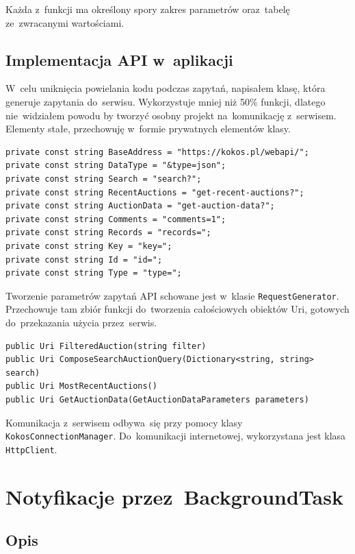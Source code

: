 \documentclass[a4paper,twoside,titlepage,openright]{book}
\begin{document}
Każda z~funkcji ma określony spory zakres parametrów oraz~tabelę ze~zwracanymi wartościami. 


\subsection{Implementacja API w~aplikacji}

W~celu uniknięcia powielania kodu podczas zapytań, napisałem klasę, która generuje zapytania do~serwisu. Wykorzystuje mniej niż 50\% funkcji, dlatego nie~widziałem powodu by tworzyć osobny projekt na~komunikację z~serwisem. Elementy stałe, przechowuję w~formie prywatnych elementów klasy.

\noindent
\begin{lstlisting}[caption=Składowe budujące zapytanie do~serwisu, label=lst:test]
private const string BaseAddress = "https://kokos.pl/webapi/";
private const string DataType = "&type=json";
private const string Search = "search?";
private const string RecentAuctions = "get-recent-auctions?";
private const string AuctionData = "get-auction-data?";
private const string Comments = "comments=1";
private const string Records = "records=";
private const string Key = "key=";
private const string Id = "id=";
private const string Type = "type=";
\end{lstlisting}


Tworzenie parametrów zapytań API schowane jest w~klasie \texttt{RequestGenerator}. Przechowuje tam zbiór funkcji do~tworzenia całościowych obiektów Uri, gotowych do~przekazania użycia przez~serwis.

\noindent
\begin{lstlisting}[caption=Nagłówki metod pozwalających składać zapytania do~serwisu., label=lst:test]
public Uri FilteredAuction(string filter)
public Uri ComposeSearchAuctionQuery(Dictionary<string, string> search)
public Uri MostRecentAuctions()
public Uri GetAuctionData(GetAuctionDataParameters parameters)
\end{lstlisting}

Komunikacja z~serwisem odbywa~się przy pomocy klasy \texttt{KokosConnectionManager}. Do~komunikacji internetowej, wykorzystana jest klasa \texttt{HttpClient}.


\section{Notyfikacje przez~BackgroundTask}


\subsection{Opis}
\end{document}

